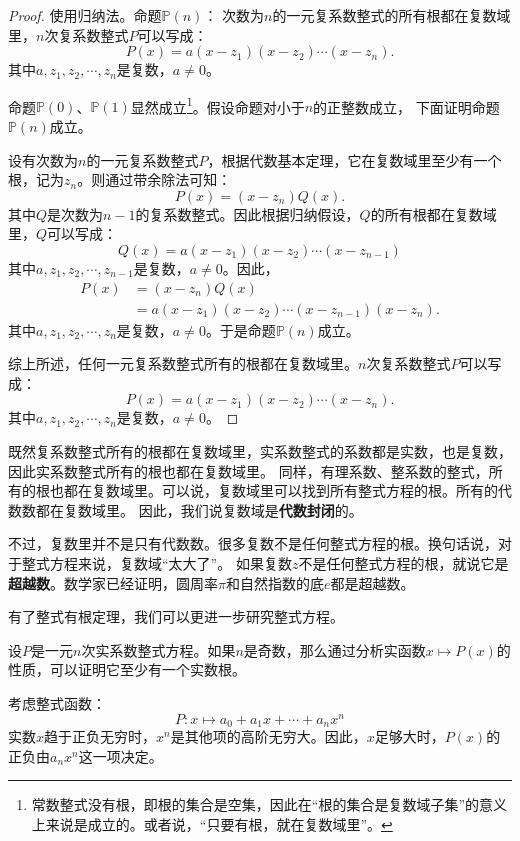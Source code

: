 \documentclass[12pt,UTF8]{ctexbook}
\begin{document}
\begin{appendix}
\begin{proof}
    使用归纳法。命题$\mathbb{P}(n)$：
    次数为$n$的一元复系数整式的所有根都在复数域里，$n$次复系数整式$P$可以写成：
    $$ P(x) = a(x - z_1)(x - z_2)\cdots(x - z_n).$$
    其中$a, z_1, z_2,\cdots, z_n$是复数，$a\neq 0$。 

    命题$\mathbb{P}(0)$、$\mathbb{P}(1)$显然成立\footnote{常数整式没有根，即根的集合是空集，因此在“根的集合是复数域子集”的意义上来说是成立的。或者说，“只要有根，就在复数域里”。}。假设命题对小于$n$的正整数成立，
    下面证明命题$\mathbb{P}(n)$成立。

    设有次数为$n$的一元复系数整式$P$，根据代数基本定理，它在复数域里至少有一个根，记为$z_n$。则通过带余除法可知：
    $$ P(x) = (x - z_n)Q(x).$$
    其中$Q$是次数为$n-1$的复系数整式。因此根据归纳假设，$Q$的所有根都在复数域里，$Q$可以写成：
    $$ Q(x) = a(x - z_1)(x - z_2)\cdots(x - z_{n-1})$$
    其中$a, z_1, z_2,\cdots, z_{n-1}$是复数，$a\neq 0$。因此，
    \begin{align*} 
        P(x) &= (x - z_n)Q(x) \\
        &= a(x - z_1)(x - z_2)\cdots(x - z_{n-1})(x - z_n).
    \end{align*}
    其中$a, z_1, z_2,\cdots, z_n$是复数，$a\neq 0$。于是命题$\mathbb{P}(n)$成立。

    综上所述，任何一元复系数整式所有的根都在复数域里。$n$次复系数整式$P$可以写成：
    $$ P(x) = a(x - z_1)(x - z_2)\cdots(x - z_n).$$
    其中$a, z_1, z_2,\cdots, z_n$是复数，$a\neq 0$。 

\end{proof}

既然复系数整式所有的根都在复数域里，实系数整式的系数都是实数，也是复数，因此实系数整式所有的根也都在复数域里。
同样，有理系数、整系数的整式，所有的根也都在复数域里。可以说，复数域里可以找到所有整式方程的根。所有的代数数都在复数域里。
因此，我们说复数域是\textbf{代数封闭}的。

不过，复数里并不是只有代数数。很多复数不是任何整式方程的根。换句话说，对于整式方程来说，复数域“太大了”。
如果复数$z$不是任何整式方程的根，就说它是\textbf{超越数}。数学家已经证明，圆周率$\pi$和自然指数的底$e$都是超越数。

有了整式有根定理，我们可以更进一步研究整式方程。

设$P$是一元$n$次实系数整式方程。如果$n$是奇数，那么通过分析实函数$x\mapsto P(x)$的性质，可以证明它至少有一个实数根。

考虑整式函数：
$$P: x\mapsto a_0 + a_1 x + \cdots + a_n x^n$$
实数$x$趋于正负无穷时，$x^n$是其他项的高阶无穷大。因此，$x$足够大时，$P(x)$的正负由$a_nx^n$这一项决定。


\end{appendix}
\end{document}
